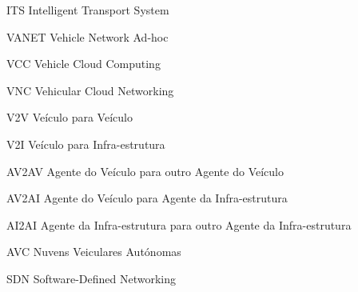 \documentclass[
	12pt,				%
	oneside,			%
	a4paper,			%
	english,			%
	brazil				%
	]{abntex2ppgsi}
\begin{document}
\listoffigures*
\cleardoublepage

\listofalgorithms
\cleardoublepage

\listoftables*
\cleardoublepage

%
%
\begin{siglas}
	\item[ITS] Intelligent Transport System
	\item[VANET] Vehicle Network Ad-hoc
	\item[VCC] Vehicle Cloud Computing
	\item[VNC] Vehicular Cloud Networking
	\item[V2V] Veículo para Veículo
	\item[V2I] Veículo para Infra-estrutura
	\item[AV2AV] Agente do Veículo para outro Agente do Veículo
	\item[AV2AI] Agente do Veículo para Agente da Infra-estrutura
	\item[AI2AI] Agente da Infra-estrutura para outro Agente da Infra-estrutura
	\item[AVC] Nuvens Veiculares Autónomas
	\item[SDN] Software-Defined Networking

\end{siglas}
\end{document}
